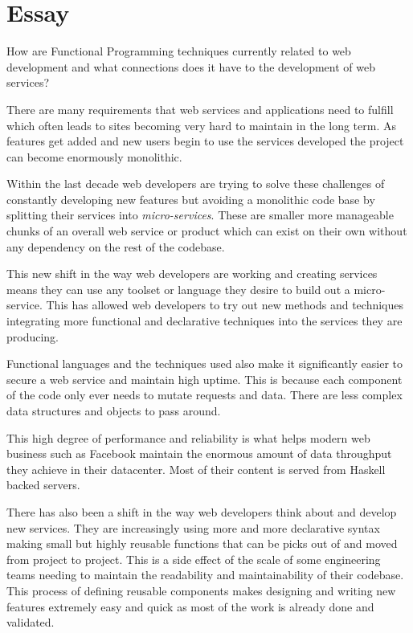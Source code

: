 \section{Essay}
How are Functional Programming techniques currently related to web development
 and what connections does it have to the development of web services?

\bigskip

There are many requirements that web services and applications need to fulfill
which often leads to sites becoming very hard to maintain in the long term. As
features get added and new users begin to use the services developed the
project can become enormously monolithic.

Within the last decade web developers are trying to solve these challenges
of constantly developing new features but avoiding a monolithic code base
by splitting their services into \textit{micro-services}. These are smaller
more manageable chunks of an overall web service or product which can
exist on their own without any dependency on the rest of the codebase.

This new shift in the way web developers are working and creating services
means they can use any toolset or language they desire to build out a micro-service.
This has allowed web developers to try out new methods and techniques integrating
more functional and declarative techniques into the services they are producing.

Functional languages and the techniques used also make it significantly easier
to secure a web service and maintain high uptime. This is because each
component of the code only ever needs to mutate requests and data. There are less
complex data structures and objects to pass around. \parencite{da2013comparing}

This high degree of performance and reliability is what helps modern
web business such as Facebook maintain
the enormous amount of data throughput they achieve in their datacenter. Most
of their content is served from Haskell backed servers. \parencite{fbconf}

There has also been a shift in the way web developers think about and develop
new services. They are increasingly using more and more declarative syntax making small
but highly reusable functions that can be picks out of and moved from project to project.
This is a side effect of the scale of some engineering teams needing to maintain
the readability and maintainability of their codebase. This process of defining
reusable components makes designing and writing new features extremely easy and
quick as most of the work is already done and validated.

